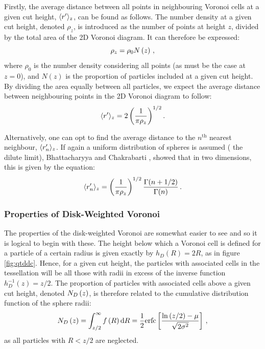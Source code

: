 Firstly, the average distance between all points in neighbouring Voronoi cells at a given cut height, $\langle r^\prime \rangle_z$, can be found as follows.
The number density at a given cut height, denoted $\rho_z$, is introduced as the number of points at height $z$, divided by the total area of the 2D Voronoi diagram.
It can therefore be expressed:
\begin{equation}
	\label{eq:numden}
	\rho_z = \rho_0 N\left(z\right)\,,
\end{equation}
where $\rho_0$ is the number density considering all points (as must be the case at $z=0$), and $N\left(z\right)$ is the proportion of particles included at a given cut height.
By dividing the area equally between all particles, we expect the average distance between neighbouring points in the 2D Voronoi diagram to follow:
\begin{equation}
	\label{eq:ndist}
	\ed = 2\left(\frac{1}{\pi\rho_z}\right)^{1/2}.%
\end{equation}

Alternatively, one can opt to find the average distance to the $n^{\mathrm{th}}$ nearest neighbour, $\langle r^\prime_n \rangle_z$.
If again a uniform distribution of spheres is assumed (\ie{} the dilute limit), Bhattacharyya and Chakrabarti \cite{Bhattacharyya2008}, showed that in two dimensions, this is given by the equation:
\begin{equation}
	\label{eq:nndist}
	\langle r^\prime_n \rangle_z = \left(\frac{1}{\pi\rho_z}\right)^{1/2}\frac{\Gamma{\left(n+1/2\right)}}{\Gamma{\left(n\right)}}\,.
\end{equation}

\subsubsection{Properties of Disk\--Weighted Voronoi}

The properties of the disk\--weighted Voronoi are somewhat easier to see and so it is logical to begin with these.
The height below which a Voronoi cell is defined for a particle of a certain radius is given exactly by $h_D\left(R\right)=2R$, as in figure \ref{fig:qtddc}.
Hence, for a given cut height, the particles with associated cells in the tessellation will be all those with radii in excess of the inverse function $h_D^{-1}\left(z\right)=z/2$.
The proportion of particles with associated cells above a given cut height, denoted $N_D\left(z\right)$, is therefore related to the cumulative distribution function of the sphere radii:
\begin{equation}
	\label{eq:ndz}
	N_D\left(z\right) = \int_{z/2}^\infty f\left(R\right) \text{d}R = \frac{1}{2}\text{erfc}\left[\frac{\ln{\left(z/2\right)}-\mu}{\sqrt{2\sigma^2}}\right]\,,
\end{equation}
as all particles with $R < z/2$ are neglected.

